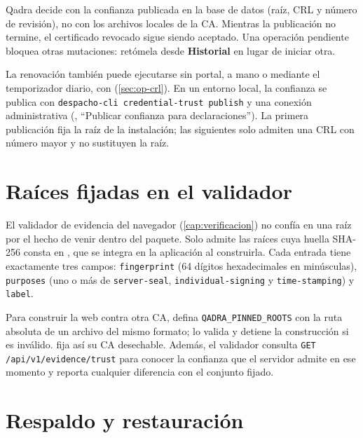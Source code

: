 Qadra decide con la confianza publicada en la base de datos (raíz, CRL y
número de revisión), no con los archivos locales de la CA. Mientras la
publicación no termine, el certificado revocado sigue siendo aceptado. Una
operación pendiente bloquea otras mutaciones: retómela desde
\textbf{Historial} en lugar de iniciar otra.

La renovación también puede ejecutarse sin portal, a mano o mediante el
temporizador diario, con 
(\cref{sec:op-crl}). En un entorno local, la confianza se publica con
\texttt{despacho-cli credential-trust publish} y una conexión administrativa
(, \enquote{Publicar confianza para declaraciones}).
La primera publicación fija la raíz de la instalación; las siguientes solo
admiten una CRL con número mayor y no sustituyen la raíz.

\section{Raíces fijadas en el validador}\label{sec:ca-raices}

El validador de evidencia del navegador (\cref{cap:verificacion}) no confía
en una raíz por el hecho de venir dentro del paquete. Solo admite las raíces
cuya huella SHA-256 consta en
, que se integra
en la aplicación al construirla. Cada entrada tiene exactamente tres campos:
\texttt{fingerprint} (64 dígitos hexadecimales en minúsculas),
\texttt{purposes} (uno o más de \texttt{server-seal},
\texttt{individual-signing} y \texttt{time-stamping}) y \texttt{label}.

Para construir la web contra otra CA, defina \texttt{QADRA\_PINNED\_ROOTS}
con la ruta absoluta de un archivo del mismo formato;
 lo valida y detiene la
construcción si es inválido.  fija así su CA
desechable. Además, el validador consulta
\texttt{GET /api/v1/evidence/trust} para conocer la confianza que el servidor
admite en ese momento y reporta cualquier diferencia con el conjunto fijado.


\section{Respaldo y restauración}\label{sec:ca-restauracion}

